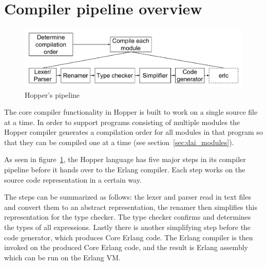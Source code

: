 \section{Compiler pipeline overview}

\begin{figure}[h!]
\centering
  \includegraphics[width=0.6\pdfpagewidth]{figure/pipeline}
  \caption{Hopper's pipeline}
  \label{fig:pipeline}
\end{figure}

The core compiler functionality in Hopper is built to work on a single source file at a time. In order to support programs consisting of multiple modules the Hopper compiler generates a compilation order for all modules in that program so that they can be compiled one at a time (see section~\ref{sec:dai_modules}).

As seen in figure~\ref{fig:pipeline}, the Hopper language has five major steps in its compiler pipeline before it hands over to the Erlang compiler. Each step works on the source code representation in a certain way.

The steps can be summarized as follows: the lexer and parser read in text files and convert them to an abstract representation, the renamer then simplifies this representation for the type checker. The type checker confirms and determines the types of all expressions. Lastly there is another simplifying step before the code generator, which produces Core Erlang code. The Erlang compiler is then invoked on the produced Core Erlang code, and the result is Erlang assembly which can be run on the Erlang VM.
